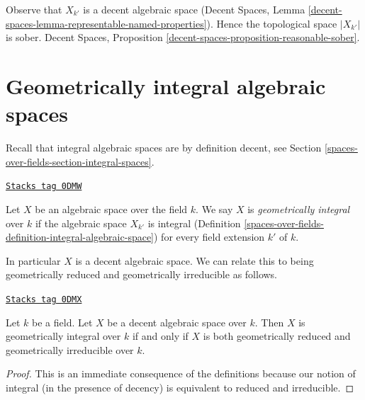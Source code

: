 Observe that $X_{k'}$ is a decent algebraic space
(Decent Spaces, Lemma
\ref{decent-spaces-lemma-representable-named-properties}).
Hence the topological space $|X_{k'}|$ is sober.
Decent Spaces, Proposition \ref{decent-spaces-proposition-reasonable-sober}.

\section{Geometrically integral algebraic spaces}
\label{spaces-over-fields-section-geometrically-integral}
Recall that integral algebraic spaces are by definition decent, see
Section \ref{spaces-over-fields-section-integral-spaces}.

\begin{definition}
\label{spaces-over-fields-definition-geometrically-integral}
\href{https://stacks.math.columbia.edu/tag/0DMW}{\texttt{Stacks tag 0DMW}}

Let $X$ be an algebraic space over the field $k$. We say $X$ is
{\it geometrically integral} over $k$ if the algebraic space
$X_{k'}$ is integral (Definition \ref{spaces-over-fields-definition-integral-algebraic-space})
for every field extension $k'$ of $k$.
\end{definition}

In particular $X$ is a decent algebraic space.
We can relate this to being geometrically reduced and
geometrically irreducible as follows.

\begin{lemma}
\label{spaces-over-fields-lemma-geometrically-integral}
\href{https://stacks.math.columbia.edu/tag/0DMX}{\texttt{Stacks tag 0DMX}}

Let $k$ be a field. Let $X$ be a decent algebraic space over $k$.
Then $X$ is geometrically integral over $k$ if and only if
$X$ is both geometrically reduced and geometrically irreducible
over $k$.
\end{lemma}

\begin{proof}
This is an immediate consequence of the definitions because our
notion of integral (in the presence of decency) is equivalent to
reduced and irreducible.
\end{proof}

